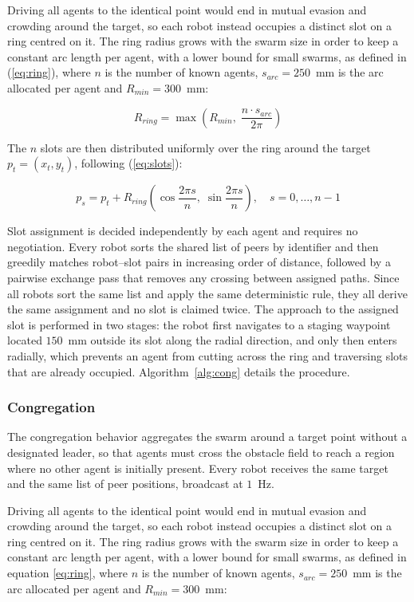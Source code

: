 \documentclass[conference]{IEEEtran}
\begin{document}
Driving all agents to the identical point would end in mutual evasion and
crowding around the target, so each robot instead occupies a distinct slot on a
ring centred on it. The ring radius grows with the swarm size in order to keep a
constant arc length per agent, with a lower bound for small swarms, as defined
in (\ref{eq:ring}), where $n$ is the number of known agents,
$s_{arc} = 250$~mm is the arc allocated per agent and $R_{min} = 300$~mm:

\begin{equation}
R_{ring} = \max \left( R_{min},\; \frac{n \cdot s_{arc}}{2\pi} \right)
\label{eq:ring}
\end{equation}

The $n$ slots are then distributed uniformly over the ring around the target
$p_{t} = (x_t, y_t)$, following (\ref{eq:slots}):

\begin{equation}
p_{s} = p_{t} + R_{ring} \left( \cos \frac{2\pi s}{n},\;
\sin \frac{2\pi s}{n} \right), \quad s = 0, \ldots, n-1
\label{eq:slots}
\end{equation}

Slot assignment is decided independently by each agent and requires no
negotiation. Every robot sorts the shared list of peers by identifier and then
greedily matches robot--slot pairs in increasing order of distance, followed by
a pairwise exchange pass that removes any crossing between assigned paths. Since
all robots sort the same list and apply the same deterministic rule, they all
derive the same assignment and no slot is claimed twice. The approach to the
assigned slot is performed in two stages: the robot first navigates to a staging
waypoint located $150$~mm outside its slot along the radial direction, and only
then enters radially, which prevents an agent from cutting across the ring and
traversing slots that are already occupied.
Algorithm~\ref{alg:cong} details the procedure.

\subsubsection{Congregation}
The congregation behavior aggregates the swarm around a target point without a
designated leader, so that agents must cross the obstacle field to reach a
region where no other agent is initially present. Every robot receives the same
target and the same list of peer positions, broadcast at $1$~Hz.

Driving all agents to the identical point would end in mutual evasion and
crowding around the target, so each robot instead occupies a distinct slot on a
ring centred on it. The ring radius grows with the swarm size in order to keep a
constant arc length per agent, with a lower bound for small swarms, as defined in
equation \ref{eq:ring}, where $n$ is the number of known agents,
$s_{arc} = 250$~mm is the arc allocated per agent and $R_{min} = 300$~mm:
\end{document}
